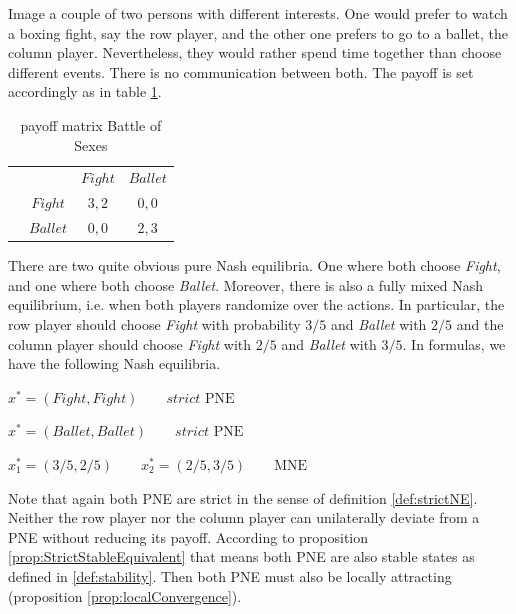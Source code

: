 Image a couple of two persons with different interests. One would prefer to watch a boxing fight, say the row player, and the other one prefers to go to a ballet, the column player. Nevertheless, they would rather spend time together than choose different events. There is no communication between both. The payoff is set accordingly as in table \ref{tab:payoffBattleOfSexes}.

\begin{table}[H]\centering
\setlength{\extrarowheight}{2pt}
\begin{tabular}{cc|c|c|}
  & \multicolumn{1}{c}{} & \multicolumn{1}{c}{$Fight$}  & \multicolumn{1}{c}{$Ballet$} \\\cline{3-4}
  & $Fight$ & $3,2$ & $0,0$ \\\cline{3-4}
  & $Ballet$ & $0,0$ & $2,3$ \\\cline{3-4}
\end{tabular}\caption{\label{tab:payoffBattleOfSexes}payoff matrix Battle of Sexes}
\end{table}

There are two quite obvious pure Nash equilibria. One where both choose \textit{Fight}, and one where both choose \textit{Ballet}. Moreover, there is also a fully mixed Nash equilibrium, i.e. when both players randomize over the actions. In particular, the row player should choose \textit{Fight} with probability $3/5$ and \textit{Ballet} with $2/5$ and the column player should choose \textit{Fight} with $2/5$ and \textit{Ballet} with $3/5$. In formulas, we have the following Nash equilibria. 

\begin{description}\centering
    \item $x^{*} = (Fight,Fight) \qquad \textit{strict }\text{PNE}$
    \item $x^{*} = (Ballet,Ballet) \qquad \textit{strict }\text{PNE}$
    \item $x_{1}^* = (3/5,2/5) \qquad x_{2}^* = (2/5,3/5) \qquad \text{MNE}$
\end{description}

Note that again both PNE are strict in the sense of definition \ref{def:strictNE}. Neither the row player nor the column player can unilaterally deviate from a PNE without reducing its payoff. According to proposition \ref{prop:StrictStableEquivalent} that means both PNE are also stable states as defined in \ref{def:stability}. Then both PNE must also be locally attracting (proposition \ref{prop:localConvergence}). \\ 

